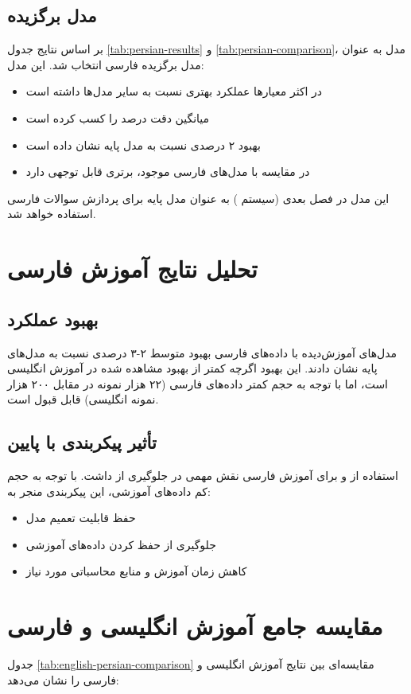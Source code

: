 \documentclass[11pt, a4paper, oneside]{book}
\begin{document}
	\subsection{مدل برگزیده}
	بر اساس نتایج جدول \ref{tab:persian-results} و \ref{tab:persian-comparison}، مدل  به عنوان مدل برگزیده فارسی انتخاب شد. این مدل:
	\begin{itemize}
		\item در اکثر معیارها عملکرد بهتری نسبت به سایر مدل‌ها داشته است
		\item میانگین دقت  درصد را کسب کرده است
		\item بهبود ۲ درصدی نسبت به مدل پایه نشان داده است
		\item در مقایسه با مدل‌های فارسی موجود، برتری قابل توجهی دارد
	\end{itemize}

	این مدل در فصل بعدی (سیستم ) به عنوان مدل پایه برای پردازش سوالات فارسی استفاده خواهد شد.

	\section{تحلیل نتایج آموزش فارسی}
	\subsection{بهبود عملکرد}
	مدل‌های آموزش‌دیده با داده‌های فارسی بهبود متوسط ۲-۳ درصدی نسبت به مدل‌های پایه نشان دادند. این بهبود اگرچه کمتر از بهبود مشاهده شده در آموزش انگلیسی است، اما با توجه به حجم کمتر داده‌های فارسی (۲۲ هزار نمونه در مقابل ۲۰۰ هزار نمونه انگلیسی) قابل قبول است.

	\subsection{تأثیر پیکربندی  با  پایین}
	استفاده از  و  برای آموزش فارسی نقش مهمی در جلوگیری از  داشت. با توجه به حجم کم داده‌های آموزشی، این پیکربندی منجر به:
	\begin{itemize}
		\item حفظ قابلیت تعمیم مدل
		\item جلوگیری از حفظ کردن داده‌های آموزشی
		\item کاهش زمان آموزش و منابع محاسباتی مورد نیاز
	\end{itemize}

	\section{مقایسه جامع آموزش انگلیسی و فارسی}
	جدول \ref{tab:english-persian-comparison} مقایسه‌ای بین نتایج آموزش انگلیسی و فارسی را نشان می‌دهد:
\end{document}
